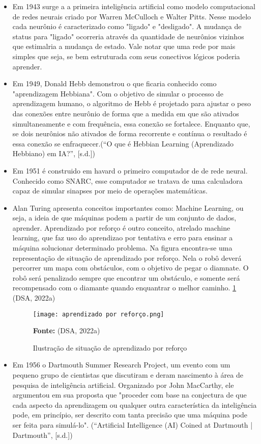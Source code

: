 \documentclass[a4paper,12pt]{article}
\begin{document}
\begin{itemize}
    \item Em 1943 surge a a primeira inteligência artificial como modelo computacional de redes neurais criado por Warren McCulloch e Walter Pitts. Nesse modelo cada neurônio é caracterizado como "ligado" e "desligado". A mudança de status para "ligado" ocorreria através da quantidade de neurônios vizinhos que estimalria a mudança de estado. Vale notar que uma rede por mais simples que seja, se bem estruturada com seus conectivos lógicos poderia aprender.

    \item Em 1949, Donald Hebb demonstrou o que ficaria 
    conhecido como "aprendizagem Hebbiana". Com o objetivo de simular o processo de aprendizagem humano, o algoritmo de Hebb é projetado para ajustar o peso das conexões entre neurônio de forma que a medida em que são ativados simultaneamente e com frequência, essa conexão se fortalece. Enquanto que, se dois neurônios não ativados de forma recorrente e contínua o resultado é essa conexão se enfraquecer.(“O que é Hebbian Learning (Aprendizado Hebbiano) em IA?”, [s.d.])

    \item Em 1951 é construido em havard o primeiro computador de de rede neural. Conhecido como SNARC, esse computador se tratava de uma calculadora capaz de simular sinapses por meio de operações matemáticas.

    \item Alan Turing apresenta conceitos importantes como: Machine Learning, ou seja, a ideia de que máquinas podem a partir de um conjunto de dados, aprender. Aprendizado por reforço é outro conceito, atrelado machine learning, que faz uso do aprendizao por tentativa e erro para ensinar a máquina solucionar determinado problema. Na figura encontra-se uma representação de situação de aprendizado por reforço. Nela o robô deverá percorrer um mapa com obstáculos, com o objetivo de pegar o diamnate. O robô será penalizado sempre que encontrar um obstáculo, e somente será recompensado com o diamante quando enquantrar o melhor caminho.  \ref{fig:turing-reforço} (DSA, 2022a)

    \begin{figure}[h]
        \caption{Ilustração de situação de aprendizado por reforço}
        \centering
        \texttt{[image: aprendizado por reforço.png]}
        \parbox{\linewidth}{\small
        \centering
        \textbf{Fonte:} (DSA, 2022a)
    }
        \label{fig:turing-reforço}
    \end{figure}

    \item Em 1956 o Dartmouth Summer Research Project, um evento com um pequeno grupo de cientistas que discutiram e deram nascimento à área de pesquisa de inteligência artificial. Organizado por John MacCarthy, ele argumentou em sua proposta que "proceder com base na conjectura de que cada aspecto da aprendizagem ou qualquer outra característica da inteligência pode, em princípio, ser descrito com tanta precisão que uma máquina pode ser feita para simulá-lo". (“Artificial Intelligence (AI) Coined at Dartmouth | Dartmouth”, [s.d.])
\end{itemize}
\end{document}
